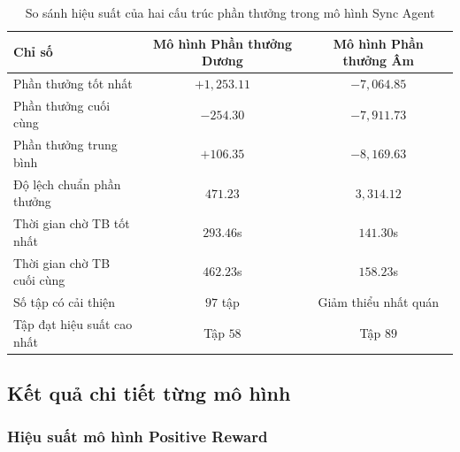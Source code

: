 \begin{table}[!htp]
    \centering
    \caption{So sánh hiệu suất của hai cấu trúc phần thưởng trong mô hình Sync Agent}
    \label{tab:sync_performance_comparison}
    \begin{tabular}{@{}lcc@{}}
        \toprule
        \textbf{Chỉ số} & \textbf{Mô hình Phần thưởng Dương} & \textbf{Mô hình Phần thưởng Âm} \\
        \midrule
        Phần thưởng tốt nhất      & $+1,253.11$                      & $-7,064.85$                      \\
        Phần thưởng cuối cùng     & $-254.30$                        & $-7,911.73$                      \\
        Phần thưởng trung bình    & $+106.35$                        & $-8,169.63$                      \\
        Độ lệch chuẩn phần thưởng & $471.23$                         & $3,314.12$                       \\
        Thời gian chờ TB tốt nhất & $293.46$s                        & $141.30$s                        \\
        Thời gian chờ TB cuối cùng & $462.23$s                        & $158.23$s                        \\
        Số tập có cải thiện       & $97$ tập                         & Giảm thiểu nhất quán            \\
        Tập đạt hiệu suất cao nhất & Tập $58$                         & Tập $89$                         \\
        \bottomrule
    \end{tabular}
\end{table}

\subsection{Kết quả chi tiết từng mô hình}

\subsubsection{Hiệu suất mô hình Positive Reward}


